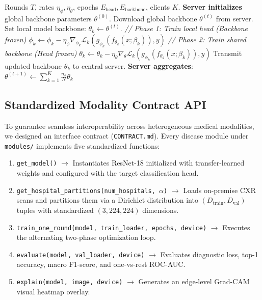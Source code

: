 \documentclass[conference]{IEEEtran}
\newcommand{\compactitems}{%
  \setlength{\itemsep}{1.2pt}%
  \setlength{\parskip}{0pt}%
  \setlength{\parsep}{0pt}%
  \setlength{\topsep}{2pt}%
  \setlength{\partopsep}{0pt}%
}
\begin{document}
\begin{algorithm}[t]
\caption{FedMedDx Decoupled Federated Training}
\label{alg:fedmeddx}
\small
\begin{algorithmic}[1]
\REQUIRE Rounds $T$, rates $\eta_\phi, \eta_\theta$, epochs $E_{\text{head}}, E_{\text{backbone}}$, clients $K$.
\STATE \textbf{Server initializes} global backbone parameters $\theta^{(0)}$.
        \STATE Download global backbone $\theta^{(t)}$ from server.
        \STATE Set local model backbone: $\theta_k \leftarrow \theta^{(t)}$.
        \STATE \textit{// Phase 1: Train local head (Backbone frozen)}
                \STATE $\phi_k \leftarrow \phi_k - \eta_\phi \nabla_{\phi_k} \mathcal{L}_k(g_{\phi_k}(f_{\theta_k}(x; \beta_k)), y)$
            \ENDFOR
        \ENDFOR
        \STATE \textit{// Phase 2: Train shared backbone (Head frozen)}
                \STATE $\theta_k \leftarrow \theta_k - \eta_\theta \nabla_\theta \mathcal{L}_k(g_{\phi_k}(f_{\theta_k}(x; \beta_k)), y)$
            \ENDFOR
        \ENDFOR
        \STATE Transmit updated backbone $\theta_k$ to central server.
    \ENDFOR
    \STATE \textbf{Server aggregates}: $\theta^{(t+1)} \leftarrow \sum_{k=1}^K \frac{n_k}{N} \theta_k$
\ENDFOR
\end{algorithmic}
\end{algorithm}

\subsection{Standardized Modality Contract API}
To guarantee seamless interoperability across heterogeneous medical modalities, we designed an interface contract (\texttt{CONTRACT.md}). Every disease module under \texttt{modules/} implements five standardized functions:
\begin{enumerate}\compactitems
    \item \texttt{get\_model()} $\to$ Instantiates ResNet-18 initialized with transfer-learned weights and configured with the target classification head.
    \item \texttt{get\_hospital\_partitions(num\_hospitals, $\alpha$)} $\to$ Loads on-premise CXR scans and partitions them via a Dirichlet distribution into $(D_{\text{train}}, D_{\text{val}})$ tuples with standardized $(3, 224, 224)$ dimensions.
    \item \texttt{train\_one\_round(model, train\_loader, epochs, device)} $\to$ Executes the alternating two-phase optimization loop.
    \item \texttt{evaluate(model, val\_loader, device)} $\to$ Evaluates diagnostic loss, top-1 accuracy, macro F1-score, and one-vs-rest ROC-AUC.
    \item \texttt{explain(model, image, device)} $\to$ Generates an edge-level Grad-CAM visual heatmap overlay.
\end{enumerate}
\end{document}

